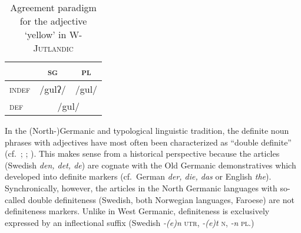 \begin{table}
\begin{center}
\begin{footnotesize}
\begin{tabular}[h]{l|cc}
\hline
\hline
		& \textsc{sg}	&\textsc{pl}\\
\hline
\textsc{indef}	&/gulʔ/	 	&/gul/\\ 	
\textsc{def}	&\multicolumn{2}{c}{/gul/}\\
\hline
\hline
\end{tabular}
\caption[Adjective paradigm for \textsc{W-Jutlandic}]{Agreement paradigm for the adjective ‘yellow’ in \textsc{W-Jutlandic} \cite{ringgaard1960}}\label{jutl agr paradigm}
\end{footnotesize}
\end{center}
\end{table}

In the (North-)Germanic and typological linguistic tradition, the definite noun phrases with adjectives have most often been characterized as “double definite” (cf.~\citealt{borjars1994}; \citealt{julien2003}; \citealt[354–355]{plank2003}). This makes sense from a historical perspective because the articles (Swedish \textit{den, det, de}) are cognate with the Old Germanic demonstratives which developed into definite markers (cf.~German \textit{der, die, das} or English \textit{the}). Synchronically, however, the articles in the North Germanic languages with so-called double definiteness (Swedish, both Norwegian languages, Faroese) are not definiteness markers. Unlike in West Germanic, definiteness is exclusively expressed by an inflectional suffix (Swedish \textit{-(e)n} \textsc{utr}, \textit{-(e)t} \textsc{n}, \textit{-n} \textsc{pl}.)

